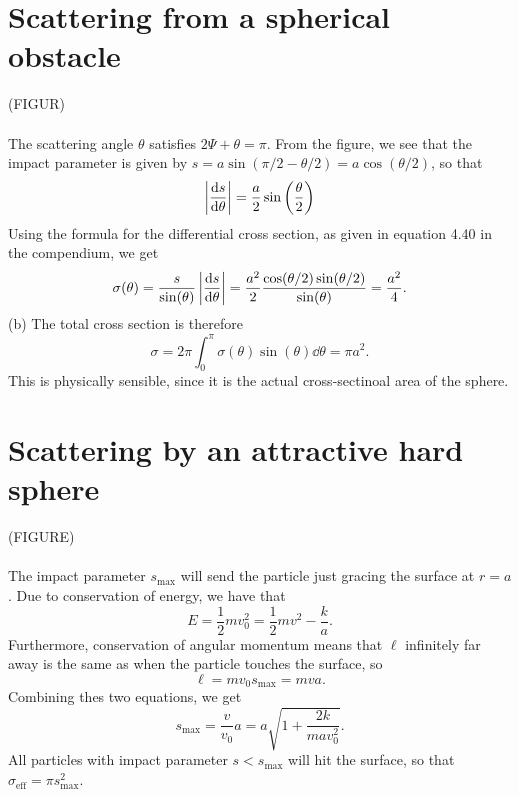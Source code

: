 \documentclass{article}
\begin{document}
    \section{Scattering from a spherical obstacle}
        (FIGUR) \\ \\
        The scattering angle $\theta$ satisfies $2 \Psi + \theta = \pi$. From the figure, we see that the impact parameter is given by $s = a \sin(\pi/2 - \theta /2 ) = a \cos(\theta / 2)$, so that 
        \begin{equation*}
            \left| \dv{s}{\theta} \right| = \frac{a}{2} \sin\left(\frac{\theta}{2}\right)
        \end{equation*}
        Using the formula for the differential cross section, as given in equation 4.40 in the compendium, we get
        \begin{equation*}
            \sigma(\theta) = \frac{s}{\sin(\theta)} \left| \dv{s}{\theta} \right| 
            = \frac{a^2}{2} \frac{\cos(\theta/2)\sin(\theta/2)}{\sin(\theta)}
             =\frac{a^2}{4}.
        \end{equation*}
        (b) The total cross section is therefore
        \begin{equation*}
            \sigma = 2 \pi \int_0^{\pi} \sigma(\theta) \sin(\theta) \dd \theta = \pi a^2.
        \end{equation*}
        This is physically sensible, since it is the actual cross-sectinoal area of the sphere.



    \section{Scattering by an attractive hard sphere}
        (FIGURE) \\ \\
        The impact parameter $s_\mathrm{max}$ will send the particle just gracing the surface at $r=a$. Due to conservation of energy, we have that 
        \begin{equation*}
            E = \frac{1}{2} m v_0^2 = \frac{1}{2}mv^2 - \frac{k}{a}.
        \end{equation*}
        Furthermore, conservation of angular momentum means that $\ell$ infinitely far away is the same as when the particle touches the surface, so
        \begin{equation*}
            \ell = m v_0 s_\mathrm{max} = mva.
        \end{equation*}
        Combining thes two equations, we get
        \begin{equation*}
            s_\mathrm{max} = \frac{v}{v_0}a = a \sqrt{1 + \frac{2 k}{m a v_0^2}}.
        \end{equation*}
        All particles with impact parameter $s < s_\mathrm{max}$ will hit the surface, so that $\sigma_\mathrm{eff} = \pi s_\mathrm{max}^2$.
\end{document}
